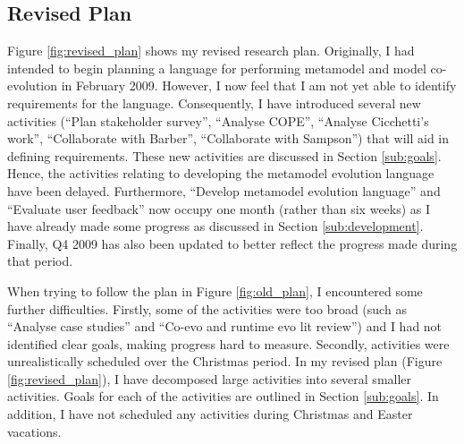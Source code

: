\subsection{Revised Plan}
\label{sub:revised_plan}
Figure \ref{fig:revised_plan} shows my revised research plan. Originally, I had intended to begin planning a language for performing metamodel and model co-evolution in February 2009. However, I now feel that I am not yet able to identify requirements for the language. Consequently, I have introduced several new activities (``Plan stakeholder survey'', ``Analyse COPE'', ``Analyse Cicchetti's work'', ``Collaborate with Barber'', ``Collaborate with Sampson'') that will aid in defining requirements. These new activities are discussed in Section \ref{sub:goals}. Hence, the activities relating to developing the metamodel evolution language have been delayed. Furthermore, ``Develop metamodel evolution language'' and ``Evaluate user feedback'' now occupy one month (rather than six weeks) as I have already made some progress as discussed in Section \ref{sub:development}. Finally, Q4 2009 has also been updated to better reflect the progress made during that period.


When trying to follow the plan in Figure \ref{fig:old_plan}, I encountered some further difficulties. Firstly, some of the activities were too broad (such as ``Analyse case studies'' and ``Co-evo and runtime evo lit review'') and I had not identified clear goals, making progress hard to measure. Secondly, activities were unrealistically scheduled over the Christmas period.  In my revised plan (Figure \ref{fig:revised_plan}), I have decomposed large activities into several smaller activities. Goals for each of the activities are outlined in Section \ref{sub:goals}. In addition, I have not scheduled any activities during Christmas and Easter vacations.

